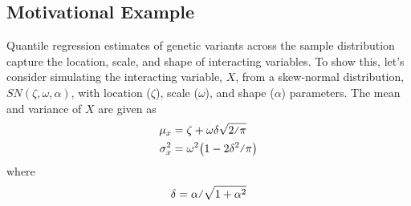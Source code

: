 \documentclass[12pt]{article}
\newcommand\vfrac[2]{\ThisStyle{%
  \setbox0=\hbox{$\SavedStyle#1#2$}%
  \setbox2=\hbox{$\SavedStyle X$}%
  \ifdim\ht0>\ht2\setlength{\ht0}{\ht2}\fi%
  #1\mathord{\stretchto{\raisebox{2.3\LMpt}{$\SavedStyle/$}}{\ht0}}#2}}
\begin{document}
\begin{appendices}
\subsection{Motivational Example}
Quantile regression estimates of genetic variants across the sample distribution capture the location, scale, and shape of interacting variables. To show this, let's consider simulating the interacting variable, $X$, from a skew-normal distribution, $SN(\zeta, \omega, \alpha)$, with location ($\zeta$), scale ($\omega$), and shape ($\alpha$) parameters. The mean and variance of $X$ are given as 
\begin{equation} \label{SNpars}
\begin{split} 
\mu_x &= \zeta + \omega\delta \sqrt{\vfrac{2}{\pi}} \\
\sigma_x^2 &= \omega^2 \big(1-\vfrac{2 \delta^2}{\pi}\big)
\end{split}
\end{equation}
where 
\begin{equation}
\delta = \vfrac{\alpha}{\sqrt{1+\alpha^2}}
\end{equation} 


\end{appendices}
\end{document}
